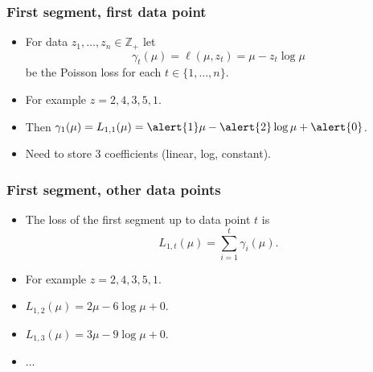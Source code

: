 \documentclass{beamer}
\newcommand{\ZZ}{\mathbb Z}
\newcommand{\z}{$z = 2, 4, 3, 5, 1$}
\begin{document}
\begin{frame}
  \frametitle{First segment, first data point}
  \begin{itemize}
  \item For data $z_1, \dots, z_n\in\ZZ_+$ let
  \begin{equation*}
    \gamma_t(\mu) = \ell(\mu, z_t) = \mu - z_t \log \mu
  \end{equation*}
  be the Poisson loss for each $t\in\{1, \dots, n\}$.
\item For example \z.
\item Then $\gamma_1(\mu)=L_{1,1}(\mu)= \alert{1}\mu - \alert{2}\log \mu + \alert{0}$.
\item Need to store 3 coefficients (\alert{linear}, \alert{log}, \alert{constant}).
  \end{itemize}
  \begin{center} 

  \end{center}
\end{frame}

\begin{frame}
  \frametitle{First segment, other data points}
  \begin{itemize}
\item
  The loss of the first segment up to data point $t$ is
  \begin{equation*}
    \label{eq:C1b}
    L_{1,t}(\mu) = \sum_{i=1}^t \gamma_i(\mu).
  \end{equation*}
\item For example \z.
\item $L_{1,2}(\mu) = 2\mu - 6\log\mu + 0$. 
\item $L_{1,3}(\mu) = 3\mu - 9\log\mu + 0$.
\item ...
  \end{itemize}
  \begin{center}
    
    
  \end{center}
\end{frame}
\end{document}
